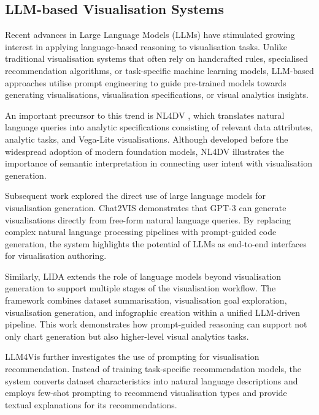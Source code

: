 \subsection{LLM-based Visualisation Systems}

Recent advances in Large Language Models (LLMs) have stimulated growing interest in applying language-based reasoning to visualisation tasks. Unlike traditional visualisation systems that often rely on handcrafted rules, specialised recommendation algorithms, or task-specific machine learning models, LLM-based approaches utilise prompt engineering to guide pre-trained models towards generating visualisations, visualisation specifications, or visual analytics insights.

An important precursor to this trend is NL4DV \cite{narechania2020nl4dv}, which translates natural language queries into analytic specifications consisting of relevant data attributes, analytic tasks, and Vega-Lite visualisations. Although developed before the widespread adoption of modern foundation models, NL4DV illustrates the importance of semantic interpretation in connecting user intent with visualisation generation.

Subsequent work explored the direct use of large language models for visualisation generation. Chat2VIS \cite{maddigan2023chat2vis} demonstrates that GPT-3 can generate visualisations directly from free-form natural language queries. By replacing complex natural language processing pipelines with prompt-guided code generation, the system highlights the potential of LLMs as end-to-end interfaces for visualisation authoring.

Similarly, LIDA \cite{dibia2023lida} extends the role of language models beyond visualisation generation to support multiple stages of the visualisation workflow. The framework combines dataset summarisation, visualisation goal exploration, visualisation generation, and infographic creation within a unified LLM-driven pipeline. This work demonstrates how prompt-guided reasoning can support not only chart generation but also higher-level visual analytics tasks.

LLM4Vis \cite{wang2023llm4vis} further investigates the use of prompting for visualisation recommendation. Instead of training task-specific recommendation models, the system converts dataset characteristics into natural language descriptions and employs few-shot prompting to recommend visualisation types and provide textual explanations for its recommendations.

